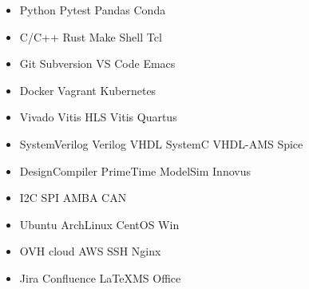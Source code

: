 \documentclass[a4paper]{MagicalCV}
\begin{document}
\begin{minipage}[t]{0.31\textwidth}
\begin{itemize}
\item Python \tb Pytest \tb Pandas \tb Conda
\item C/C++ \tb Rust \tb Make \tb Shell \tb Tcl
\item Git \tb Subversion \tb VS Code \tb Emacs
\item Docker \tb Vagrant \tb Kubernetes
\end{itemize}
\sectionsep


\begin{itemize}
\item Vivado \tb Vitis HLS \tb Vitis \tb Quartus
\item SystemVerilog \tb Verilog \tb VHDL \tb SystemC \tb VHDL-AMS \tb Spice
\item DesignCompiler \tb PrimeTime \tb ModelSim \tb Innovus
\item I2C \tb SPI \tb AMBA \tb CAN
\end{itemize}
\sectionsep


\begin{itemize}
\item Ubuntu \tb ArchLinux \tb CentOS \tb Win
\item OVH cloud \tb AWS \tb SSH \tb Nginx
\item Jira \tb Confluence \tb \LaTeX \tb MS Office
\end{itemize}
\sectionsep




\end{minipage} 
\hfill
\end{document}
